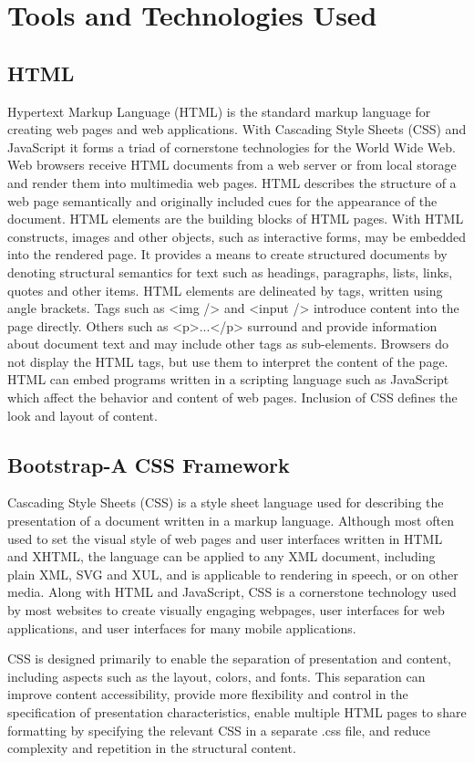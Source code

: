 \chapter{Tools and Technologies Used}
\section{HTML}
Hypertext Markup Language (HTML) is the standard markup language for creating web pages and web applications. With Cascading Style Sheets (CSS) and JavaScript it forms a triad of cornerstone technologies for the World Wide Web. Web browsers receive HTML documents from a web server or from local storage and render them into multimedia web pages. HTML describes the structure of a web page semantically and originally included cues for the appearance of the document.
HTML elements are the building blocks of HTML pages. With HTML constructs, images and other objects, such as interactive forms, may be embedded into the rendered page. It provides a means to create structured documents by denoting structural semantics for text such as headings, paragraphs, lists, links, quotes and other items. HTML elements are delineated by tags, written using angle brackets. Tags such as <img /> and <input /> introduce content into the page directly. Others such as <p>...</p> surround and provide information about document text and may include other tags as sub-elements. Browsers do not display the HTML tags, but use them to interpret the content of the page.
HTML can embed programs written in a scripting language such as JavaScript which affect the behavior and content of web pages. Inclusion of CSS defines the look and layout of content. 
\section{Bootstrap-A CSS Framework}
Cascading Style Sheets (CSS) is a style sheet language used for describing the presentation of a document written in a markup language. Although most often used to set the visual style of web pages and user interfaces written in HTML and XHTML, the language can be applied to any XML document, including plain XML, SVG and XUL, and is applicable to rendering in speech, or on other media. Along with HTML and JavaScript, CSS is a cornerstone technology used by most websites to create visually engaging webpages, user interfaces for web applications, and user interfaces for many mobile applications.

CSS is designed primarily to enable the separation of presentation and content, including aspects such as the layout, colors, and fonts. This separation can improve content accessibility, provide more flexibility and control in the specification of presentation characteristics, enable multiple HTML pages to share formatting by specifying the relevant CSS in a separate .css file, and reduce complexity and repetition in the structural content.


